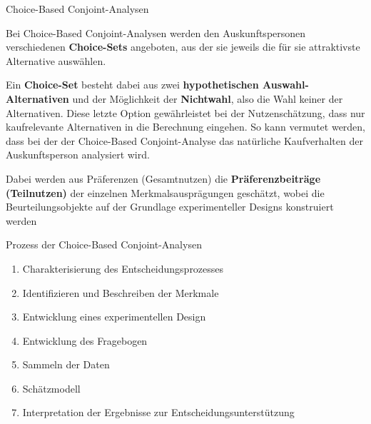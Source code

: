 \documentclass[12pt,ngerman,a4paper,ignorenonframetext,]{beamer}
\providecommand{\tightlist}{%
  \setlength{\itemsep}{0pt}\setlength{\parskip}{0pt}}
\begin{document}
\begin{frame}{Choice-Based Conjoint-Analysen}
\protect\hypertarget{choice-based-conjoint-analysen}{}

Bei Choice-Based Conjoint-Analysen werden den Auskunftspersonen
verschiedenen \textbf{Choice-Sets} angeboten, aus der sie jeweils die
für sie attraktivste Alternative auswählen.

Ein \textbf{Choice-Set} besteht dabei aus zwei \textbf{hypothetischen
Auswahl-Alternativen} und der Möglichkeit der \textbf{Nichtwahl}, also
die Wahl keiner der Alternativen. Diese letzte Option gewährleistet bei
der Nutzenschätzung, dass nur kaufrelevante Alternativen in die
Berechnung eingehen. So kann vermutet werden, dass bei der der
Choice-Based Conjoint-Analyse das natürliche Kaufverhalten der
Auskunftsperson analysiert wird.

Dabei werden aus Präferenzen (Gesamtnutzen) die
\textbf{Präferenzbeiträge (Teilnutzen)} der einzelnen
Merkmalsausprägungen geschätzt, wobei die Beurteilungsobjekte auf der
Grundlage experimenteller Designs konstruiert werden

\end{frame}

\begin{frame}{Prozess der Choice-Based Conjoint-Analysen}
\protect\hypertarget{prozess-der-choice-based-conjoint-analysen}{}

\begin{enumerate}
\tightlist
\item
  Charakterisierung des Entscheidungsprozesses
\item
  Identifizieren und Beschreiben der Merkmale
\item
  Entwicklung eines experimentellen Design
\item
  Entwicklung des Fragebogen
\item
  Sammeln der Daten
\item
  Schätzmodell
\item
  Interpretation der Ergebnisse zur Entscheidungsunterstützung
\end{enumerate}

\end{frame}
\end{document}
